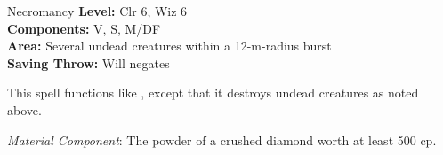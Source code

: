 {Necromancy}
{
	\textbf{Level:}
	Clr 6, Wiz 6\\
	\textbf{Components:}
	V, S, M/DF\\
	\textbf{Area:}
	Several undead creatures within a 12-m-radius burst\\
	\textbf{Saving Throw:}
	Will negates\\
}
{
	This spell functions like , except that it destroys undead creatures as noted above.

	\textit{Material Component}:
	The powder of a crushed diamond worth at least 500 cp.

}
